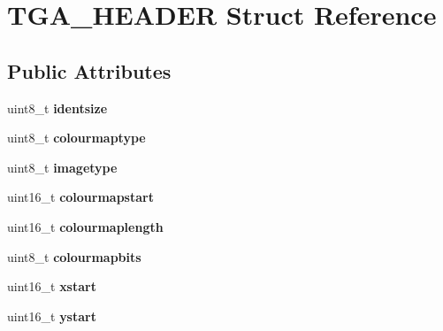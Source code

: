 \hypertarget{struct_t_g_a___h_e_a_d_e_r}{\section{T\+G\+A\+\_\+\+H\+E\+A\+D\+E\+R Struct Reference}
\label{struct_t_g_a___h_e_a_d_e_r}
}
\subsection*{Public Attributes}
\begin{DoxyCompactItemize}
\item 
\hypertarget{struct_t_g_a___h_e_a_d_e_r_a24767bbea9837b5e69a551555d6ae6d5}{uint8\+\_\+t {\bfseries identsize}}\label{struct_t_g_a___h_e_a_d_e_r_a24767bbea9837b5e69a551555d6ae6d5}

\item 
\hypertarget{struct_t_g_a___h_e_a_d_e_r_a7f39098acf09c7e0bcf5da1263abc2ae}{uint8\+\_\+t {\bfseries colourmaptype}}\label{struct_t_g_a___h_e_a_d_e_r_a7f39098acf09c7e0bcf5da1263abc2ae}

\item 
\hypertarget{struct_t_g_a___h_e_a_d_e_r_a4e4d5350ed7662d89eb841f2ccd3e5be}{uint8\+\_\+t {\bfseries imagetype}}\label{struct_t_g_a___h_e_a_d_e_r_a4e4d5350ed7662d89eb841f2ccd3e5be}

\item 
\hypertarget{struct_t_g_a___h_e_a_d_e_r_a4bd3c933946d8e1d1b5fe68fe4ac4ad4}{uint16\+\_\+t {\bfseries colourmapstart}}\label{struct_t_g_a___h_e_a_d_e_r_a4bd3c933946d8e1d1b5fe68fe4ac4ad4}

\item 
\hypertarget{struct_t_g_a___h_e_a_d_e_r_a3fd7762731fe9cefcf6439597e60e514}{uint16\+\_\+t {\bfseries colourmaplength}}\label{struct_t_g_a___h_e_a_d_e_r_a3fd7762731fe9cefcf6439597e60e514}

\item 
\hypertarget{struct_t_g_a___h_e_a_d_e_r_af496e79ef170941542a0b0a9eb58c6ae}{uint8\+\_\+t {\bfseries colourmapbits}}\label{struct_t_g_a___h_e_a_d_e_r_af496e79ef170941542a0b0a9eb58c6ae}

\item 
\hypertarget{struct_t_g_a___h_e_a_d_e_r_a81956b9f5bc9969bc85552926ef424e9}{uint16\+\_\+t {\bfseries xstart}}\label{struct_t_g_a___h_e_a_d_e_r_a81956b9f5bc9969bc85552926ef424e9}

\item 
\hypertarget{struct_t_g_a___h_e_a_d_e_r_a8971d8b3e132b8bea33645a2cfe7b0dd}{uint16\+\_\+t {\bfseries ystart}}\label{struct_t_g_a___h_e_a_d_e_r_a8971d8b3e132b8bea33645a2cfe7b0dd}


\end{DoxyCompactItemize}
